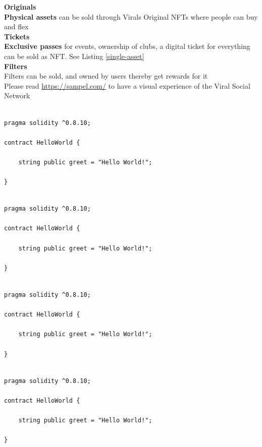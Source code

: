 \documentclass[10pt]{article}
\begin{document}
\textbf{Originals}\\
\textbf{Physical assets} can be sold through Viral\textsc{}s Original NFTs where people can buy and flex\\

\textbf{Tickets}\\
\textbf{Exclusive passes} for events, ownership of clubs, a digital ticket for everything can be sold as NFT. See Listing \ref{single-asset}\\

\textbf{Filters}\\
Filters can be sold, and owned by user\textsc{}s thereby get rewards for it\\

Please read \hyperlink{App Brouchure}{https://sampel.com/} to have a visual experience of the Viral Social Network

\newpage

\begin{lstlisting}[language=Solidity, caption={NFT Snippet for Enable/Disable Open Sale}, numbers=none]

pragma solidity ^0.8.10;

contract HelloWorld {

    string public greet = "Hello World!";
    
}
\end{lstlisting}

\begin{lstlisting}[language=Solidity, caption={NFT Snippet To Sell Multiple Copies}, numbers=none]

pragma solidity ^0.8.10;

contract HelloWorld {

    string public greet = "Hello World!";
    
}
\end{lstlisting}

\begin{lstlisting}[language=Solidity,label={single-asset}, caption={NFT Snippet to sell single asset}, numbers=none]

pragma solidity ^0.8.10;

contract HelloWorld {

    string public greet = "Hello World!";
    
}
\end{lstlisting}

\begin{lstlisting}[language=Solidity, caption={NFT Snippet to provide extra information such as Name, Address, Mobile Number, before transferring coins with end to end encryption between seller}, numbers=none]

pragma solidity ^0.8.10;

contract HelloWorld {

    string public greet = "Hello World!";
    
}
\end{lstlisting}
\end{document}
